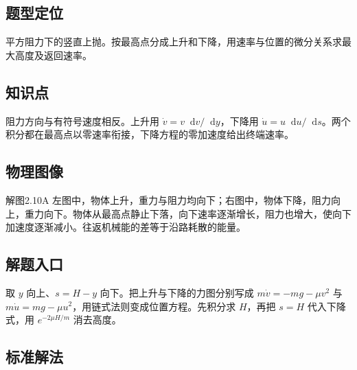 \documentclass[UTF8,fontset=fandol,a4paper,11pt]{ctexart}
\newcommand{\dd}{\mathop{}\!\mathrm{d}}
\begin{document}


\subsection*{题型定位}

平方阻力下的竖直上抛。按最高点分成上升和下降，用速率与位置的微分关系求最大高度及返回速率。



\subsection*{知识点}

阻力方向与有符号速度相反。上升用 $\dot v=v\dd v/\dd y$，下降用 $\dot u=u\dd u/\dd s$。两个积分都在最高点以零速率衔接，下降方程的零加速度给出终端速率。




\subsection*{物理图像}

解图2.10A 左图中，物体上升，重力与阻力均向下；右图中，物体下降，阻力向上，重力向下。物体从最高点静止下落，向下速率逐渐增长，阻力也增大，使向下加速度逐渐减小。往返机械能的差等于沿路耗散的能量。



\subsection*{解题入口}

取 $y$ 向上、$s=H-y$ 向下。把上升与下降的力图分别写成 $m\dot v=-mg-\mu v^2$ 与 $m\dot u=mg-\mu u^2$，用链式法则变成位置方程。先积分求 $H$，再把 $s=H$ 代入下降式，用 $e^{-2\mu H/m}$ 消去高度。



\subsection*{标准解法}
\end{document}
